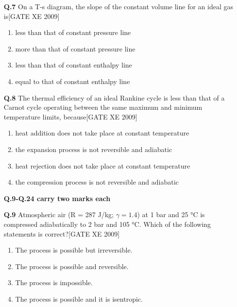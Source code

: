 \documentclass[journal,12pt,onecolumn]{IEEEtran}
\theoremstyle{remark}
\begin{document}
\begin{enumerate}
\begin{enumerate}
\begin{enumerate}
\item[\textbf{Q.7}]  On a T-s diagram, the slope of the constant volume line for an ideal gas is\hfill[GATE XE 2009]
\begin{multicols}{2}
\begin{enumerate}
    \item less than that of constant pressure line
    \item more than that of constant pressure line
    \item less than that of constant enthalpy line
    \item equal to that of constant enthalpy line
\end{enumerate}
\end{multicols}

\vspace{0.3cm}

\item[\textbf{Q.8}]  The thermal efficiency of an ideal Rankine cycle is less than that of a Carnot cycle operating between the same maximum and minimum temperature limits, because\hfill[GATE XE 2009]
\begin{multicols}{2}
\begin{enumerate}
    \item heat addition does not take place at constant temperature
    \item the expansion process is not reversible and adiabatic
    \item heat rejection does not take place at constant temperature
    \item the compression process is not reversible and adiabatic
\end{enumerate}
\end{multicols}
\textbf{Q.9-Q.24 carry two marks each}
\setcounter{enumi}{8} %

\item[\textbf{Q.9}] Atmospheric air (R = 287 J/kg; $\gamma = 1.4$) at 1 bar and 25 °C is compressed adiabatically to 2 bar and 105 °C. Which of the following statements is correct?\hfill[GATE XE 2009]
\begin{multicols}{2}
\begin{enumerate}
    \item The process is possible but irreversible.
    \item The process is possible and reversible.
    \item The process is impossible.
    \item The process is possible and it is isentropic.
\end{enumerate}
\end{multicols}


\end{enumerate}
\end{enumerate}
\end{enumerate}
\end{document}
